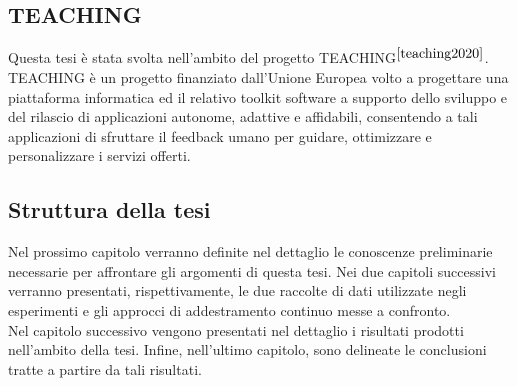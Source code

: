 \subsection*{TEACHING}
Questa tesi è stata svolta nell'ambito del progetto TEACHING$^{\cite{teaching2020}}$.\\TEACHING è un progetto finanziato dall'Unione Europea volto a progettare una piattaforma informatica ed il relativo toolkit software a supporto dello sviluppo e del rilascio di applicazioni autonome, adattive e affidabili, consentendo a tali applicazioni di sfruttare il feedback umano per guidare, ottimizzare e personalizzare i servizi offerti.

\subsection*{Struttura della tesi}
Nel prossimo capitolo verranno definite nel dettaglio le conoscenze preliminarie necessarie per affrontare gli argomenti di questa tesi. Nei due capitoli successivi verranno presentati, rispettivamente, le due raccolte di dati utilizzate negli esperimenti e gli approcci di addestramento continuo messe a confronto.\\
Nel capitolo successivo vengono presentati nel dettaglio i risultati prodotti nell'ambito della tesi. Infine, nell'ultimo capitolo, sono delineate le conclusioni tratte a partire da tali risultati.